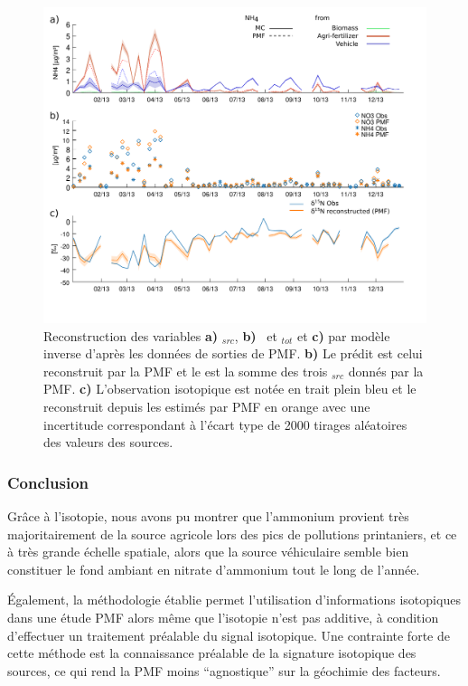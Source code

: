 \begin{figure}[ht]
    \centering
    \includegraphics[width=1.0\textwidth]{figures/INACS/PMF_OPE_reconstruction.pdf}
    \caption{Reconstruction des variables \textbf{a)} \NHq$_{src}$, \textbf{b)} \NOt~et
        \NHq$_{tot}$ et \textbf{c)} \dN{} par modèle inverse d'après les données de sorties
        de PMF.
        \textbf{b)} Le \NOt{} prédit est celui reconstruit par la PMF et le \NHq{} est la
        somme des trois \NHq$_{src}$ donnés par la PMF.
        \textbf{c)} L'observation isotopique \dN{} est notée en trait plein bleu et le
        \dN{} reconstruit depuis les \NHq{} estimés par PMF en orange avec une incertitude
        correspondant à l'écart type de 2000 tirages aléatoires des valeurs des sources.
    }
    \label{fig:PMFreconstruct}
\end{figure}

\subsubsection{Conclusion}%
\label{ssub:conclusion_isotopie}


Grâce à l'isotopie, nous avons pu montrer que l'ammonium provient très majoritairement
de la source agricole lors des pics de pollutions printaniers, et ce à très grande échelle
spatiale, alors que la source véhiculaire semble bien constituer le fond ambiant en
nitrate d'ammonium tout le long de l'année.

Également, la méthodologie établie permet l'utilisation d'informations isotopiques dans
une étude PMF alors même que l'isotopie n'est pas additive, à condition d'effectuer un
traitement préalable du signal isotopique. Une contrainte forte de cette méthode est la
connaissance préalable de la signature isotopique des sources, ce qui rend la PMF moins
``agnostique'' sur la géochimie des facteurs.


